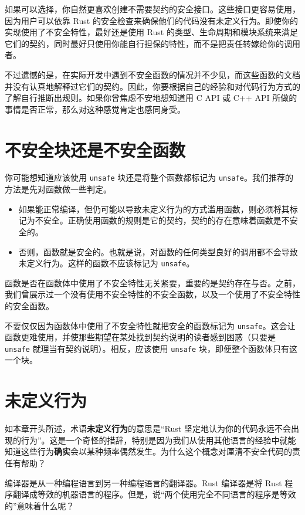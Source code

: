 如果可以选择，你自然更喜欢创建不需要契约的安全接口。这些接口更容易使用，因为用户可以依靠 Rust 的安全检查来确保他们的代码没有未定义行为。即使你的实现使用了不安全特性，最好还是使用 Rust 的类型、生命周期和模块系统来满足它们的契约，同时最好只使用你能自行担保的特性，而不是把责任转嫁给你的调用者。

不过遗憾的是，在实际开发中遇到不安全函数的情况并不少见，而这些函数的文档并没有认真地解释过它们的契约。因此，你要根据自己的经验和对代码行为方式的了解自行推断出规则。如果你曾焦虑不安地想知道用 C API 或 C++ API 所做的事情是否正常，那么对这种感觉肯定也感同身受。

\section{不安全块还是不安全函数}

你可能想知道应该使用 \texttt{unsafe} 块还是将整个函数都标记为 \texttt{unsafe}。我们推荐的方法是先对函数做一些判定。

\begin{itemize}
\item 如果能正常编译，但仍可能以导致未定义行为的方式滥用函数，则必须将其标记为不安全。正确使用函数的规则是它的契约，契约的存在意味着函数是不安全的。
\item 否则，函数就是安全的。也就是说，对函数的任何类型良好的调用都不会导致未定义行为。这样的函数不应该标记为 \texttt{unsafe}。
\end{itemize}

函数是否在函数体中使用了不安全特性无关紧要，重要的是契约存在与否。之前，我们曾展示过一个没有使用不安全特性的不安全函数，以及一个使用了不安全特性的安全函数。

不要仅仅因为函数体中使用了不安全特性就把安全的函数标记为 \texttt{unsafe}。这会让函数更难使用，并使那些期望在某处找到契约说明的读者感到困惑（只要是 \texttt{unsafe} 就理当有契约说明）。相反，应该使用 \texttt{unsafe} 块，即便整个函数体只有这一个块。

\section{未定义行为}

如本章开头所述，术语\textbf{未定义行为}的意思是“Rust 坚定地认为你的代码永远不会出现的行为”。这是一个奇怪的措辞，特别是因为我们从使用其他语言的经验中就能知道这些行为\textbf{确实}会以某种频率偶然发生。为什么这个概念对厘清不安全代码的责任有帮助？

编译器是从一种编程语言到另一种编程语言的翻译器。Rust 编译器是将 Rust 程序翻译成等效的机器语言的程序。但是，说“两个使用完全不同语言的程序是等效的”意味着什么呢？

